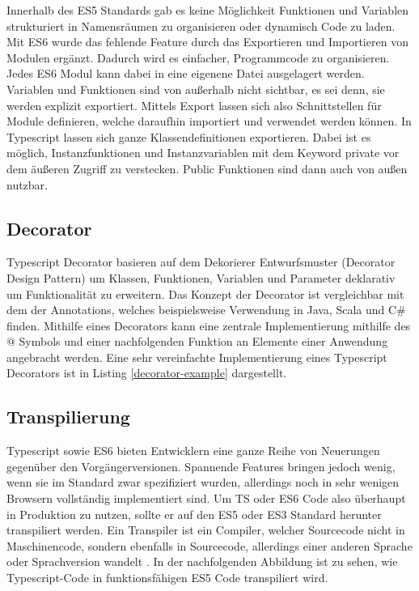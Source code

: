 Innerhalb des ES5 Standards gab es keine Möglichkeit Funktionen und Variablen strukturiert in Namensräumen zu organisieren oder dynamisch Code zu laden.
Mit ES6 wurde das fehlende Feature durch das Exportieren und Importieren von Modulen ergänzt. Dadurch wird es einfacher, Programmcode zu organisieren.
Jedes ES6 Modul kann dabei in eine eigenene Datei ausgelagert werden. Variablen und Funktionen sind von außerhalb nicht sichtbar, es sei denn, sie werden explizit exportiert.
Mittels Export lassen sich also Schnittstellen für Module definieren, welche daraufhin importiert und verwendet werden können.
In Typescript lassen sich ganze Klassendefinitionen exportieren.
Dabei ist es möglich, Instanzfunktionen und Instanzvariablen mit dem Keyword private vor dem äußeren Zugriff zu verstecken.
Public Funktionen sind dann auch von außen nutzbar.



\subsection{Decorator}

Typescript Decorator basieren auf dem Dekorierer Entwurfsmuster (Decorator Design Pattern) um Klassen,
Funktionen, Variablen und Parameter deklarativ um Funktionalität zu erweitern.
Das Konzept der Decorator ist vergleichbar mit dem der Annotations, welches beispielsweise Verwendung in Java, Scala und C\#
finden.
Mithilfe eines Decorators kann eine zentrale Implementierung
mithilfe des @ Symbols und einer nachfolgenden Funktion an Elemente einer Anwendung angebracht werden.
Eine sehr vereinfachte Implementierung eines Typescript Decorators ist in Listing \ref{decorator-example} dargestellt.

\vspace{0.3cm}

\vspace{0.3cm}


\subsection{Transpilierung}

Typescript sowie ES6 bieten Entwicklern eine ganze Reihe von Neuerungen gegenüber den Vorgängerversionen.
Spannende Features bringen jedoch wenig, wenn sie im Standard zwar spezifiziert wurden,
allerdings noch in sehr wenigen Browsern vollständig implementiert sind.
Um TS oder ES6 Code also überhaupt in Produktion zu nutzen, sollte er auf den ES5 oder ES3
Standard herunter transpiliert werden.
Ein Transpiler ist ein Compiler, welcher Sourcecode nicht in Maschinencode, sondern ebenfalls in Sourcecode,
allerdings einer anderen Sprache oder Sprachversion wandelt \cite{Introduction-to-the-Typescript-Transpiler}.
In der nachfolgenden Abbildung ist zu sehen, wie Typescript-Code in funktionsfähigen ES5 Code transpiliert wird.


